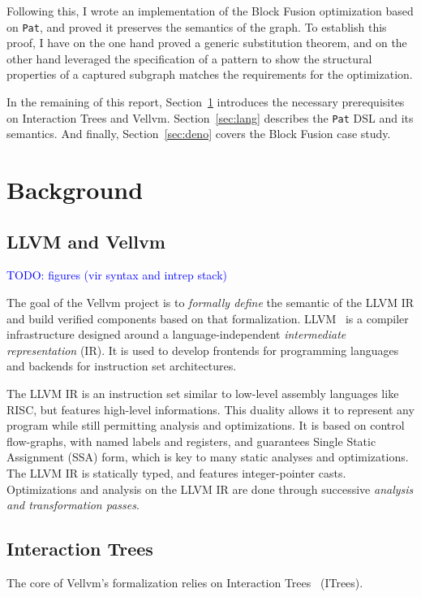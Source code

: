 \documentclass[11pt]{article}
\newcommand{\leon}[1]{\textcolor{blue}{#1}}
\newcommand{\pat}{\texttt{Pat}\xspace}
\begin{document}
Following this, I wrote an implementation of the Block Fusion optimization based on \pat{}, and proved it preserves the semantics of the graph. To establish this proof, I have on the one hand proved a generic substitution theorem, and on the other hand leveraged the specification of a pattern to show the structural properties of a captured subgraph matches the requirements for the optimization.

In the remaining of this report, Section~\ref{sec:background} introduces the necessary prerequisites on Interaction Trees and Vellvm. Section~\ref{sec:lang} describes the \pat{} DSL and its semantics. And finally, Section~\ref{sec:deno} covers the Block Fusion case study.

\section{Background}
\label{sec:background}

\subsection{LLVM and Vellvm}

\leon{TODO: figures (vir syntax and intrep stack)}

The goal of the Vellvm project is to \emph{formally define} the semantic of the LLVM IR and build verified
components based on that formalization.
%
LLVM~\cite{LLVM} is a compiler infrastructure designed around a language-independent \emph{intermediate representation} (IR). It is used to develop frontends for programming languages and backends for instruction set architectures.

The LLVM IR is an instruction set similar to low-level assembly languages like RISC, but features high-level informations. This duality allows it to represent any program while still permitting analysis and optimizations. It is based on control flow-graphs, with named labels and registers, and guarantees Single Static Assignment (SSA) form, which is key to many static analyses and optimizations. The LLVM IR is statically typed, and features integer-pointer casts.
%
Optimizations and analysis on the LLVM IR are done through successive \emph{analysis and transformation passes}.

\subsection{Interaction Trees}

The core of Vellvm's formalization relies on Interaction Trees~\cite{ITrees} (ITrees).
\end{document}
